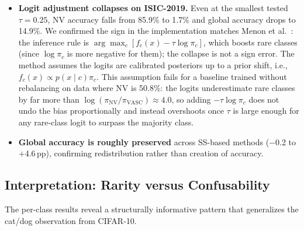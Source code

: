 \documentclass[11pt,a4paper]{article}
\begin{document}
\begin{itemize}
      baseline 23.6\%), because the column norms of the classifier
      $W$ vary only from 1.40 to 1.60 across all 8 classes-despite
      accuracy varying from 10.5\% to 85.9\%. The ISIC imbalance
      is not encoded in the classifier weight norms; it is upstream,
      in the feature representation.
    \item \textbf{Logit adjustment collapses on ISIC-2019.} Even at
      the smallest tested $\tau = 0.25$, NV accuracy falls from
      85.9\% to 1.7\% and global accuracy drops to 14.9\%. We confirmed
      the sign in the implementation matches Menon et
      al.~\cite{menon2021}: the inference rule is
      $\arg\max_c [f_c(x) - \tau \log \pi_c]$, which boosts rare
      classes (since $\log \pi_c$ is more negative for them); the
      collapse is not a sign error. The method assumes the logits
      are calibrated posteriors up to a prior shift, i.e.,
      $f_c(x) \propto p(x \mid c)\pi_c$. This assumption fails for
      a baseline trained without rebalancing on data where NV is
      50.8\%: the logits underestimate rare classes by far more than
      $\log(\pi_{\mathrm{NV}}/\pi_{\mathrm{VASC}}) \approx 4.0$, so
      adding $-\tau \log \pi_c$ does not undo the bias proportionally
      and instead overshoots once $\tau$ is large enough for any
      rare-class logit to surpass the majority class.
    \item \textbf{Global accuracy is roughly preserved} across SS-based
      methods ($-$0.2 to $+$4.6\,pp), confirming redistribution
      rather than creation of accuracy.
\end{itemize}

\subsection{Interpretation: Rarity versus Confusability}
\label{sec:isic-interpretation}

The per-class results reveal a structurally informative pattern that
generalizes the cat/dog observation from CIFAR-10.
\end{document}
